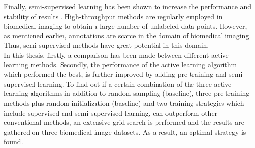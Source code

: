 Finally, semi-supervised learning has been shown to increase the performance and stability of results \cite{sohn2020, tarvainen2017}. High-throughput methods are regularly employed in biomedical imaging \cite{blasi2016} to obtain a large number of unlabeled data points. However, as mentioned earlier, annotations are scarce in the domain of biomedical imaging. Thus, semi-supervised methods have great potential in this domain. \\
In this thesis, firstly, a comparison has been made between different active learning methods. Secondly, the performance of the active learning algorithm which performed the best, is further improved by adding pre-training and semi-supervised learning. To find out if a certain combination of the three active learning algorithms in addition to random sampling (baseline), three pre-training methods plus random initialization (baseline) and two training strategies which include supervised and semi-supervised learning, can outperform other conventional methods, an extensive grid search is performed and the results are gathered on three biomedical image datasets. As a result, an optimal strategy is found.